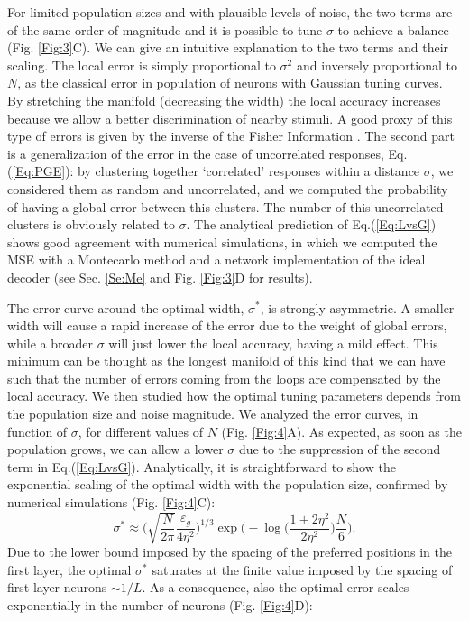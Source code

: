 \documentclass[a4paper]{article}
\begin{document}
 
For limited population sizes and with plausible levels of noise, the two terms are of the same order of magnitude and it is possible to tune $\sigma$ to achieve a balance (Fig. \ref{Fig:3}C). We can give an intuitive explanation to the two terms and their scaling. The local error is simply proportional to $\sigma^2$ and inversely proportional to $N$, as the classical error in population of neurons with Gaussian tuning curves. By stretching the manifold (decreasing the width) the local accuracy increases because we allow a better discrimination of nearby stimuli. A good proxy of this type of errors is given by the inverse of the Fisher Information \cite[]{Seung1993SimpleCodes}.
The second part is a generalization of the error in the case of uncorrelated responses, Eq.(\ref{Eq:PGE}): by clustering together `correlated' responses within a distance $\sigma$, we considered them as random and uncorrelated, and we computed the probability of having a global error between this clusters. The number of this uncorrelated clusters is obviously related to $\sigma$.
The analytical prediction of Eq.(\ref{Eq:LvsG}) shows good agreement with numerical simulations, in which we computed the MSE with a Montecarlo method and a network implementation of the ideal decoder (see Sec. \ref{Se:Me} and  Fig. \ref{Fig:3}D for results). 


The error curve around the optimal width, $\sigma^*$, is strongly asymmetric. A smaller width will cause a rapid increase of the error due to the weight of global errors, while a broader $\sigma$ will just lower the local accuracy, having a mild effect. This minimum can be thought as the longest manifold of this kind that we can have such that the number of errors coming from the loops are compensated by the local accuracy. We then studied how the optimal tuning parameters depends from the population size and noise magnitude. We analyzed the error curves, in function of $\sigma$, for different values of $N$ (Fig. \ref{Fig:4}A). As expected,  as soon as the population grows, we can allow a lower $\sigma$ due to the suppression of the second term in Eq.(\ref{Eq:LvsG}).
Analytically, it is straightforward to show the exponential scaling of the optimal width with the population size, confirmed by numerical simulations (Fig. \ref{Fig:4}C):
\begin{equation}
\sigma^* \approx \Big(\sqrt{\frac{N}{2\pi}}\frac{\bar{\varepsilon}_g}{4\eta^2} \Big)^{1/3} \exp{\Big(- \log\big(\frac{1+2\eta^2}{2\eta^2} \big) \frac{N}{6}\Big)}.
\label{Sigma_opt}
\end{equation}Due to the lower bound imposed by the spacing of the preferred positions in the first layer, the optimal $\sigma^*$ saturates at the finite value imposed by the spacing of first layer neurons $\sim 1/L$.
As a consequence, also the optimal error scales exponentially in the number of neurons (Fig. \ref{Fig:4}D):
\end{document}
